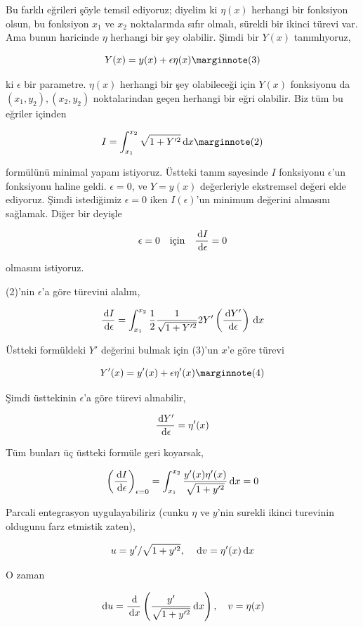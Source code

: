 \documentclass[12pt,fleqn]{article}\usepackage{../../common}
\begin{document}
Bu farklı eğrileri şöyle temsil ediyoruz; diyelim ki $\eta(x)$ herhangi bir
fonksiyon olsun, bu fonksiyon $x_1$ ve $x_2$ noktalarında sıfır olmalı,
sürekli bir ikinci türevi var. Ama bunun haricinde $\eta$ herhangi bir şey
olabilir. Şimdi bir $Y(x)$ tanımlıyoruz,

$$
Y(x) = y(x) + \epsilon \eta(x) 
\mlabel{3}
$$

ki $\epsilon$ bir parametre. $\eta(x)$ herhangi bir şey olabileceği için
$Y(x)$ fonksiyonu da $(x_1,y_2),(x_2,y_2)$ noktalarindan geçen herhangi bir
eğri olabilir. Biz tüm bu eğriler içinden

$$
I = \int_{x_1}^{x_2} \sqrt{ 1 + Y'^2} \ud x 
\mlabel{2}
$$

formülünü minimal yapanı istiyoruz. Üstteki tanım sayesinde $I$ fonksiyonu
$\epsilon$'un fonksiyonu haline geldi. $\epsilon = 0$, ve $Y = y(x)$
değerleriyle ekstremsel değeri elde ediyoruz. Şimdi istediğimiz
$\epsilon=0$ iken $I(\epsilon)$'un minimum değerini almasını
sağlamak. Diğer bir deyişle 

$$
\epsilon = 0 \quad \textrm{için} \quad \frac{\,\mathrm{d} I}{\,\mathrm{d} \epsilon} = 0
$$

olmasını istiyoruz.

(2)'nin $\epsilon$'a göre türevini alalım, 

$$
\frac{\,\mathrm{d} I}{\,\mathrm{d} \epsilon} = \int_{x_1}^{x_2} 
\frac{1}{2} \frac{1}{\sqrt{1 + Y'^2}} 2Y' 
\left( \frac{\,\mathrm{d} Y'}{\,\mathrm{d} \epsilon} \right) 
\,\mathrm{d} x
$$

Üstteki formüldeki $Y'$ değerini bulmak için (3)'un $x$'e göre türevi

$$
Y'(x) = y'(x) + \epsilon \eta'(x) 
\mlabel{4}
$$

Şimdi üsttekinin $\epsilon$'a göre türevi alınabilir,

$$
\frac{\,\mathrm{d} Y'}{\,\mathrm{d} \epsilon} = \eta'(x)
$$

Tüm bunları üç üstteki formüle geri koyarsak, 

$$
\left( \frac{\,\mathrm{d} I}{\,\mathrm{d} \epsilon} \right)_{\epsilon = 0} =
\int_{x_1}^{x_2} \frac{ y'(x)\eta'(x) }{\sqrt{1 + y'^2}} \,\mathrm{d} x = 0
$$

Parcali entegrasyon uygulayabiliriz (cunku $\eta$ ve $y$'nin surekli ikinci
turevinin oldugunu farz etmistik zaten),

$$
u = y' / \sqrt{1 + y'^2}, \quad \,\mathrm{d} v = \eta'(x) \,\mathrm{d} x
$$

O zaman 

$$
\,\mathrm{d} u = \frac{\,\mathrm{d}}{\,\mathrm{d} x} \left( \frac{y'}{\sqrt{1+y'^2}} \,\mathrm{d} x \right),
\quad 
v = \eta(x)
$$
\end{document}

